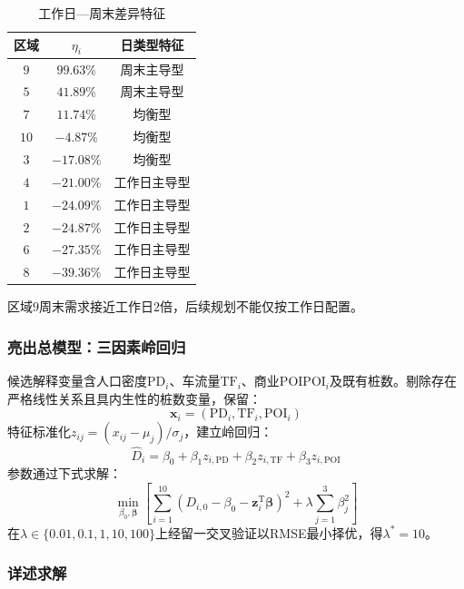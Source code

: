 \documentclass[a4paper,12pt]{ctexart}
\begin{document}
\begin{table}[H]
\centering
\caption{工作日—周末差异特征}
\begin{tabular}{ccc}
\toprule
区域 & $\eta_{i}$ & 日类型特征 \\
\midrule
$9$ & $99.63\%$ & 周末主导型 \\
$5$ & $41.89\%$ & 周末主导型 \\
$7$ & $11.74\%$ & 均衡型 \\
$10$ & $-4.87\%$ & 均衡型 \\
$3$ & $-17.08\%$ & 均衡型 \\
$4$ & $-21.00\%$ & 工作日主导型 \\
$1$ & $-24.09\%$ & 工作日主导型 \\
$2$ & $-24.87\%$ & 工作日主导型 \\
$6$ & $-27.35\%$ & 工作日主导型 \\
$8$ & $-39.36\%$ & 工作日主导型 \\
\bottomrule
\end{tabular}
\end{table}

区域$9$周末需求接近工作日$2$倍，后续规划不能仅按工作日配置。

\subsubsection{亮出总模型：三因素岭回归}

候选解释变量含人口密度$\mathrm{PD}_{i}$、车流量$\mathrm{TF}_{i}$、商业POI$\mathrm{POI}_{i}$及既有桩数。剔除存在严格线性关系且具内生性的桩数变量，保留：
\begin{equation}
\mathbf{x}_{i}=(\mathrm{PD}_{i},\mathrm{TF}_{i},\mathrm{POI}_{i})\tag{1-5}
\end{equation}
特征标准化$z_{ij}=(x_{ij}-\mu_{j})/\sigma_{j}$，建立岭回归：
\begin{equation}
\hat{D}_{i}=\beta_{0}+\beta_{1}z_{i,\mathrm{PD}}+\beta_{2}z_{i,\mathrm{TF}}+\beta_{3}z_{i,\mathrm{POI}}\tag{1-6}
\end{equation}
参数通过下式求解：
\begin{equation}
\min_{\beta_{0},\boldsymbol{\beta}}\left[\sum_{i=1}^{10}(D_{i,0}-\beta_{0}-\mathbf{z}_{i}^{\mathrm{T}}\boldsymbol{\beta})^{2}+\lambda\sum_{j=1}^{3}\beta_{j}^{2}\right]\tag{1-7}
\end{equation}
在$\lambda\in\{0.01,0.1,1,10,100\}$上经留一交叉验证以RMSE最小择优，得$\lambda^{*}=10$。

\subsubsection{详述求解}
\end{document}
